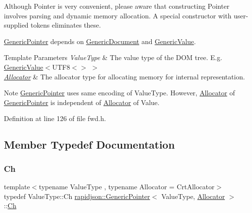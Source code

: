 Although Pointer is very convenient, please aware that constructing Pointer involves parsing and dynamic memory allocation. A special constructor with user-\/ supplied tokens eliminates these.

\mbox{\hyperlink{classrapidjson_1_1_generic_pointer}{Generic\+Pointer}} depends on \mbox{\hyperlink{classrapidjson_1_1_generic_document}{Generic\+Document}} and \mbox{\hyperlink{classrapidjson_1_1_generic_value}{Generic\+Value}}.


\begin{DoxyTemplParams}{Template Parameters}
{\em Value\+Type} & The value type of the D\+OM tree. E.\+g. \mbox{\hyperlink{classrapidjson_1_1_generic_value}{Generic\+Value}}$<$U\+T\+F8$<$$>$ $>$ \\
\hline
{\em \mbox{\hyperlink{classrapidjson_1_1_allocator}{Allocator}}} & The allocator type for allocating memory for internal representation.\\
\hline
\end{DoxyTemplParams}
\begin{DoxyNote}{Note}
\mbox{\hyperlink{classrapidjson_1_1_generic_pointer}{Generic\+Pointer}} uses same encoding of Value\+Type. However, \mbox{\hyperlink{classrapidjson_1_1_allocator}{Allocator}} of \mbox{\hyperlink{classrapidjson_1_1_generic_pointer}{Generic\+Pointer}} is independent of \mbox{\hyperlink{classrapidjson_1_1_allocator}{Allocator}} of Value. 
\end{DoxyNote}


Definition at line 126 of file fwd.\+h.



\subsection{Member Typedef Documentation}
\mbox{\label{classrapidjson_1_1_generic_pointer_a850f78846c5548565f8395be5f3427b7}} 
\subsubsection{\texorpdfstring{Ch}{Ch}}
{\footnotesize\ttfamily template$<$typename Value\+Type , typename Allocator  = Crt\+Allocator$>$ \\
typedef Value\+Type\+::\+Ch \mbox{\hyperlink{classrapidjson_1_1_generic_pointer}{rapidjson\+::\+Generic\+Pointer}}$<$ Value\+Type, \mbox{\hyperlink{classrapidjson_1_1_allocator}{Allocator}} $>$\+::\mbox{\hyperlink{classrapidjson_1_1_generic_pointer_a850f78846c5548565f8395be5f3427b7}{Ch}}}



